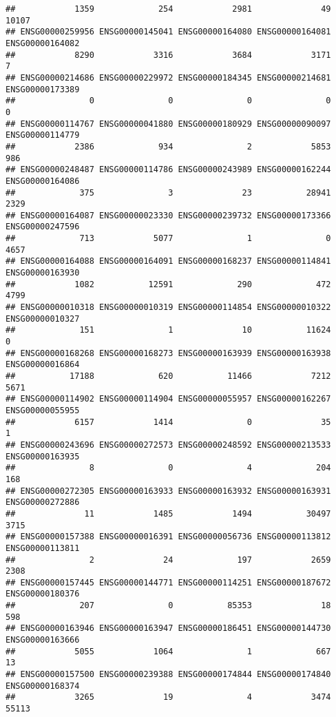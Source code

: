 \documentclass[
]{article}
\begin{document}
\begin{verbatim}
##            1359             254            2981              49           10107 
## ENSG00000259956 ENSG00000145041 ENSG00000164080 ENSG00000164081 ENSG00000164082 
##            8290            3316            3684            3171               7 
## ENSG00000214686 ENSG00000229972 ENSG00000184345 ENSG00000214681 ENSG00000173389 
##               0               0               0               0               0 
## ENSG00000114767 ENSG00000041880 ENSG00000180929 ENSG00000090097 ENSG00000114779 
##            2386             934               2            5853             986 
## ENSG00000248487 ENSG00000114786 ENSG00000243989 ENSG00000162244 ENSG00000164086 
##             375               3              23           28941            2329 
## ENSG00000164087 ENSG00000023330 ENSG00000239732 ENSG00000173366 ENSG00000247596 
##             713            5077               1               0            4657 
## ENSG00000164088 ENSG00000164091 ENSG00000168237 ENSG00000114841 ENSG00000163930 
##            1082           12591             290             472            4799 
## ENSG00000010318 ENSG00000010319 ENSG00000114854 ENSG00000010322 ENSG00000010327 
##             151               1              10           11624               0 
## ENSG00000168268 ENSG00000168273 ENSG00000163939 ENSG00000163938 ENSG00000016864 
##           17188             620           11466            7212            5671 
## ENSG00000114902 ENSG00000114904 ENSG00000055957 ENSG00000162267 ENSG00000055955 
##            6157            1414               0              35               1 
## ENSG00000243696 ENSG00000272573 ENSG00000248592 ENSG00000213533 ENSG00000163935 
##               8               0               4             204             168 
## ENSG00000272305 ENSG00000163933 ENSG00000163932 ENSG00000163931 ENSG00000272886 
##              11            1485            1494           30497            3715 
## ENSG00000157388 ENSG00000016391 ENSG00000056736 ENSG00000113812 ENSG00000113811 
##               2              24             197            2659            2308 
## ENSG00000157445 ENSG00000144771 ENSG00000114251 ENSG00000187672 ENSG00000180376 
##             207               0           85353              18             598 
## ENSG00000163946 ENSG00000163947 ENSG00000186451 ENSG00000144730 ENSG00000163666 
##            5055            1064               1             667              13 
## ENSG00000157500 ENSG00000239388 ENSG00000174844 ENSG00000174840 ENSG00000168374 
##            3265              19               4            3474           55113 

\end{verbatim}
\end{document}
